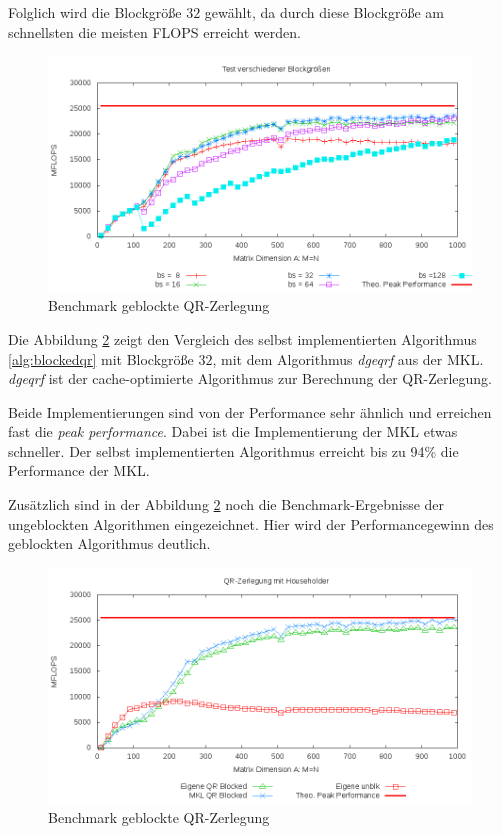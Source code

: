 Folglich wird die Blockgröße $32$ gewählt, da durch diese Blockgröße am schnellsten die meisten FLOPS erreicht werden.

\begin{figure}[H]
	\includegraphics[width=\textwidth]{images/blkbs.png}
	\caption{Benchmark geblockte QR-Zerlegung}
	\label{img:blkbs}
\end{figure}


\newpage

Die Abbildung \ref{img:blk} zeigt den Vergleich des selbst implementierten Algorithmus \ref{alg:blockedqr} mit Blockgröße $32$, mit dem Algorithmus  \textit{dgeqrf} aus der MKL.
\textit{dgeqrf} ist der cache-optimierte Algorithmus zur Berechnung der QR-Zerlegung.

Beide Implementierungen sind von der Performance sehr ähnlich und erreichen fast die \textit{peak performance}. 
Dabei ist die Implementierung der MKL etwas schneller.
Der selbst implementierten Algorithmus erreicht bis zu 94\% die Performance der MKL.


Zusätzlich sind in der Abbildung \ref{img:blk} noch die Benchmark-Ergebnisse der ungeblockten Algorithmen eingezeichnet. Hier wird der Performancegewinn des geblockten Algorithmus deutlich.

\begin{figure}[H]
  \includegraphics[width=\textwidth]{images/both.png}
  \caption{Benchmark geblockte QR-Zerlegung}
  \label{img:blk}
\end{figure}

